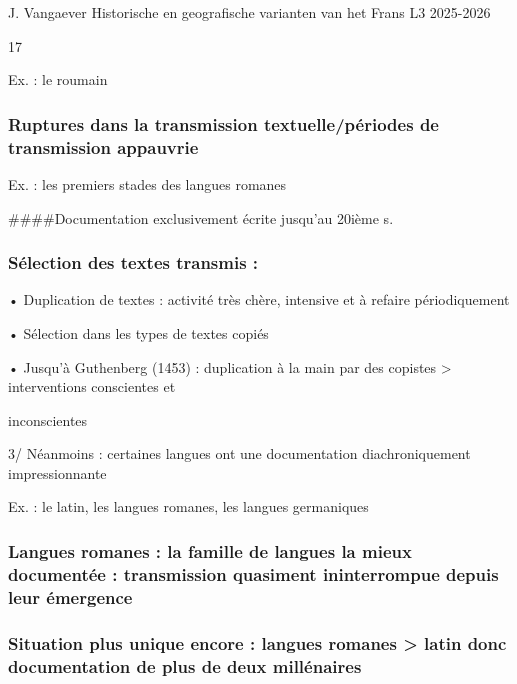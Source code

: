 \documentclass[
  letterpaper,
]{scrbook}
\begin{document}
J. Vangaever Historische en geografische varianten van het Frans L3
2025-2026

17

Ex. : le roumain

\hypertarget{ruptures-dans-la-transmission-textuellepuxe9riodes-de-transmission-appauvrie}{%
\subsubsection{Ruptures dans la transmission textuelle/périodes de
transmission
appauvrie}\label{ruptures-dans-la-transmission-textuellepuxe9riodes-de-transmission-appauvrie}}

Ex. : les premiers stades des langues romanes

\#\#\#\#Documentation exclusivement écrite jusqu'au 20ième s.

\hypertarget{suxe9lection-des-textes-transmis}{%
\subsubsection{Sélection des textes transmis
:}\label{suxe9lection-des-textes-transmis}}

• Duplication de textes : activité très chère, intensive et à refaire
périodiquement

• Sélection dans les types de textes copiés

• Jusqu'à Guthenberg (1453) : duplication à la main par des copistes
\textgreater{} interventions conscientes et

inconscientes

3/ Néanmoins : certaines langues ont une documentation diachroniquement
impressionnante

Ex. : le latin, les langues romanes, les langues germaniques

\hypertarget{langues-romanes-la-famille-de-langues-la-mieux-documentuxe9e-transmission-quasiment-ininterrompue-depuis-leur-uxe9mergence}{%
\subsubsection{Langues romanes : la famille de langues la mieux
documentée : transmission quasiment ininterrompue depuis leur
émergence}\label{langues-romanes-la-famille-de-langues-la-mieux-documentuxe9e-transmission-quasiment-ininterrompue-depuis-leur-uxe9mergence}}

\hypertarget{situation-plus-unique-encore-langues-romanes-latin-donc-documentation-de-plus-de-deux-milluxe9naires}{%
\subsubsection{Situation plus unique encore : langues romanes
\textgreater{} latin donc documentation de plus de deux
millénaires}\label{situation-plus-unique-encore-langues-romanes-latin-donc-documentation-de-plus-de-deux-milluxe9naires}}
\end{document}
